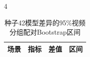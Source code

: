 \begin{PaperTable}{4}

\begin{table}[!htbp]
\centering\caption{种子42模型差异的95\%视频分组配对Bootstrap区间\label{q2-tab9}}
\begin{tabular}{@{}llll@{}}
\toprule
\begin{minipage}[b]{\dimexpr 0.290000\linewidth-1.740000\tabcolsep\relax}\raggedright
场景\strut
\end{minipage} & \begin{minipage}[b]{\dimexpr 0.170000\linewidth-1.020000\tabcolsep\relax}\raggedright
指标\strut
\end{minipage} & \begin{minipage}[b]{\dimexpr 0.160000\linewidth-0.960000\tabcolsep\relax}\raggedleft
差值\strut
\end{minipage} & \begin{minipage}[b]{\dimexpr 0.380000\linewidth-2.280000\tabcolsep\relax}\raggedright
区间\strut
\end{minipage}\tabularnewline
\midrule


\end{tabular}
\end{table}
\end{PaperTable}
